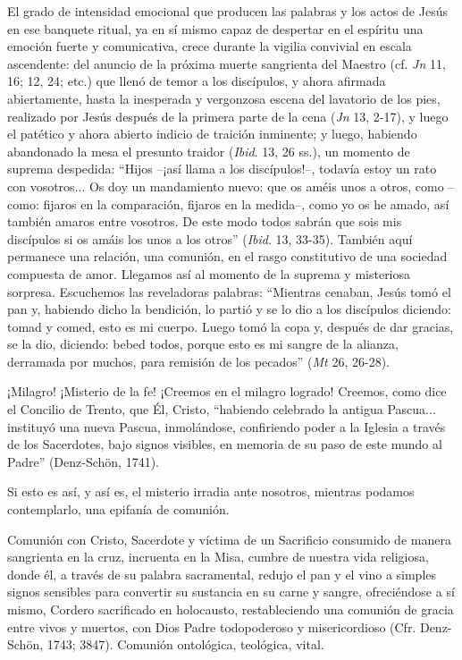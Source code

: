 			\begin{body}El grado de intensidad emocional que producen las palabras y los actos de Jesús en ese banquete ritual, ya en sí mismo capaz de despertar en el espíritu una emoción fuerte y comunicativa, crece durante la vigilia convivial en escala ascendente: del anuncio de la próxima muerte sangrienta del Maestro (cf. \textit{Jn }11, 16; 12, 24; etc.) que llenó de temor a los discípulos, y ahora afirmada abiertamente, hasta la inesperada y vergonzosa escena del lavatorio de los pies, realizado por Jesús después de la primera parte de la cena (\textit{Jn }13, 2-17), y luego el patético y ahora abierto indicio de traición inminente; y luego, habiendo abandonado la mesa el presunto traidor (\textit{Ibid}. 13, 26 ss.), un momento de suprema despedida: “Hijos –¡así llama a los discípulos!–, todavía estoy un rato con vosotros... Os doy un mandamiento nuevo: que os améis unos a otros, como –como: fijaros en la comparación, fijaros en la medida–, como yo os he amado, así también amaros entre vosotros. De este modo todos sabrán que sois mis discípulos si os amáis los unos a los otros” (\textit{Ibid}. 13, 33-35). También aquí permanece una relación, una comunión, en el rasgo constitutivo de una sociedad compuesta de amor. Llegamos así al momento de la suprema y misteriosa sorpresa. Escuchemos las reveladoras palabras: “Mientras cenaban, Jesús tomó el pan y, habiendo dicho la bendición, lo partió y se lo dio a los discípulos diciendo: tomad y comed, esto es mi cuerpo. Luego tomó la copa y, después de dar gracias, se la dio, diciendo: bebed todos, porque esto es mi sangre de la alianza, derramada por muchos, para remisión de los pecados” (\textit{Mt} 26, 26-28). \end{body}
			
			\begin{body}¡Milagro! ¡Misterio de la fe! ¡Creemos en el milagro logrado! Creemos, como dice el Concilio de Trento, que Él, Cristo, “habiendo celebrado la antigua Pascua... instituyó una nueva Pascua, inmolándose, confiriendo poder a la Iglesia a través de los Sacerdotes, bajo signos visibles, en memoria de su paso de este mundo al Padre” (Denz-Schön, 1741). \end{body}
			
			\begin{body}Si esto es así, y así es, el misterio irradia ante nosotros, mientras podamos contemplarlo, una epifanía de comunión.\end{body}
			
			\begin{body}Comunión con Cristo, Sacerdote y víctima de un Sacrificio consumido de manera sangrienta en la cruz, incruenta en la Misa, cumbre de nuestra vida religiosa, donde él, a través de su palabra sacramental, redujo el pan y el vino a simples signos sensibles para convertir su sustancia en su carne y sangre, ofreciéndose a sí mismo, Cordero sacrificado en holocausto, restableciendo una comunión de gracia entre vivos y muertos, con Dios Padre todopoderoso y misericordioso (Cfr. Denz-Schön, 1743; 3847). Comunión ontológica, teológica, vital. \end{body}
			
